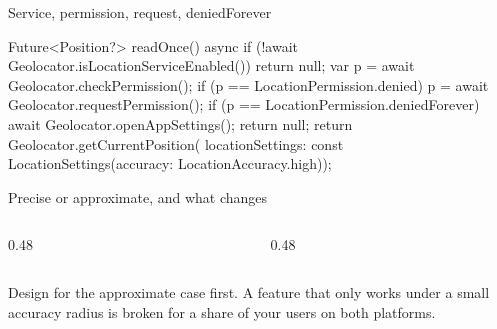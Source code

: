 \documentclass[10pt,aspectratio=169,t]{beamer}
\begin{document}
\begin{frame}[fragile,eyebrow=Task II]{Service, permission, request, deniedForever}
\begin{dart}
Future<Position?> readOnce() async {
  if (!await Geolocator.isLocationServiceEnabled()) return null;
  var p = await Geolocator.checkPermission();
  if (p == LocationPermission.denied) {
    p = await Geolocator.requestPermission();
  }
  if (p == LocationPermission.deniedForever) {
    await Geolocator.openAppSettings();
    return null;
  }
  return Geolocator.getCurrentPosition(
    locationSettings: const LocationSettings(accuracy: LocationAccuracy.high));
}
\end{dart}
\end{frame}

\begin{frame}[eyebrow=Task II]{Precise or approximate, and what changes}
  \vskip 2mm
  \begin{columns}[T]
    \begin{column}{0.48\textwidth}
    \end{column}
    \begin{column}{0.48\textwidth}
    \end{column}
  \end{columns}
  \begin{takeaway}{Design for the approximate case first.}
    A feature that only works under a small accuracy radius is broken for a share of your users on both platforms.
  \end{takeaway}
\end{frame}
\end{document}
